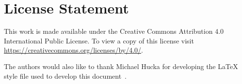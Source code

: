 \section{License Statement}


This work is made available under the Creative Commons Attribution 4.0 International Public License. To view a copy of this license visit \href{https://creativecommons.org/licenses/by/4.0/}{https://creativecommons.org/licenses/by/4.0/}.

The authors would also like to thank Michael Hucka for developing the LaTeX style file used to develop this document~\citep{hucka2017sbmlpkgspec}.
